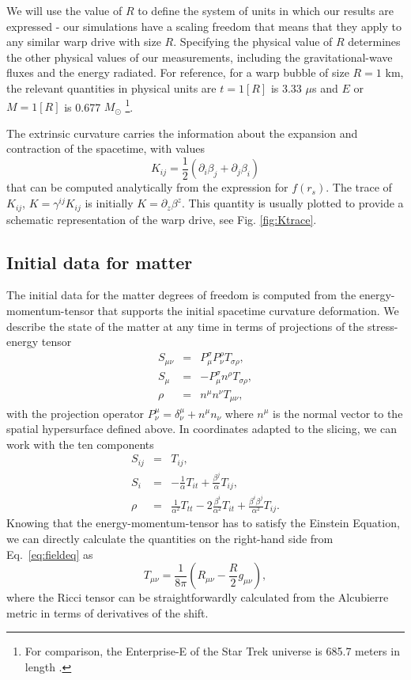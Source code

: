 \documentclass[twocolumn, numberedappendix, twocolappendix,apj, iop, a4paper]{openjournal}
\begin{document}
We will use the value of $R$ to define the system of units in which our results are expressed - our simulations have a scaling freedom that means that they apply to any similar warp drive with size $R$. Specifying the physical value of $R$ determines the other physical values of our measurements, including the gravitational-wave fluxes and the energy radiated. For reference, for a warp bubble of size $R=1$ km, the relevant quantities in physical units are $t=1[R]$ is 3.33 $\mu$s and $E$ or $M=1[R]$ is 0.677 $M_\odot$
\footnote{For comparison, the Enterprise-E of the Star Trek universe is 685.7 meters in length \citep{drexler2014ships}.}.

The extrinsic curvature carries the information about the expansion and contraction of the spacetime, with values
\begin{equation}
 K_{ij} = \frac{1}{2} \left( \partial_i \beta_j + \partial_j \beta_i \right)
\end{equation}
that can be computed analytically from the expression for $f(r_s)$. The trace of $K_{ij}$, $K=\gamma^{ij} K_{ij}$ is initially $K=\partial_z \beta^z$. This quantity is usually plotted to provide a schematic representation of the warp drive, see Fig. \ref{fig:Ktrace}.

\subsection{Initial data for matter}

The initial data for the matter degrees of freedom is computed from the energy-momentum-tensor that supports the initial spacetime curvature deformation. 
We describe the state of the matter at any time in terms of projections of the stress-energy tensor
\begin{eqnarray}
S_{\mu \nu} & =& P^\sigma_\mu P^\rho_\nu T_{\sigma \rho}, \\
S_\mu& = & - P^\sigma_\mu n^\rho T_{\sigma \rho}, \\
\rho & = & n^\mu n^\nu T_{\mu \nu}, 
\end{eqnarray}
with the projection operator $P^\mu_\nu = \delta^\mu_\nu + n^\mu n_\nu$ where $n^\mu$ is the normal vector to the spatial hypersurface defined above. In coordinates adapted to the slicing, we can work with the ten components
\begin{eqnarray}
S_{ij} & =& T_{ij}, \\
S_i& = & -\frac{1}{\alpha} T_{it} + \frac{\beta^j}{\alpha}T_{ij}, \\
\rho & = & \frac{1}{\alpha^2} T_{tt} - 2 \frac{\beta^i}{\alpha^2}T_{it} + \frac{\beta^i\beta^j}{\alpha^2}T_{ij}.
\end{eqnarray}
Knowing that the energy-momentum-tensor has to satisfy the Einstein Equation, we can directly calculate the quantities on the right-hand side from Eq.~\eqref{eq:fieldeq} as
\begin{equation}
 T_{\mu \nu} = \frac{1}{8 \pi} \left( R_{\mu \nu} - \frac{R}{2} g_{\mu \nu} \right),
\end{equation}
where the Ricci tensor can be straightforwardly calculated from the Alcubierre metric in terms of derivatives of the shift. 
\end{document}
